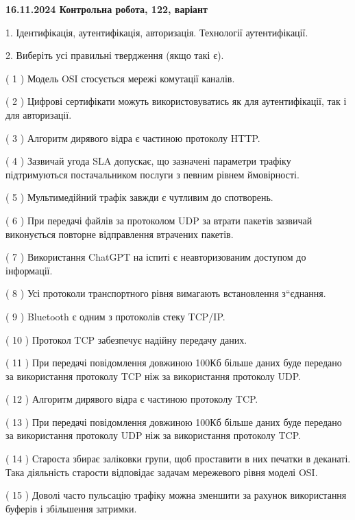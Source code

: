 \documentclass[12pt, ukrainian]{article}
\begin{document}
\vspace{4mm}
\newpage
\begin {large}

\textbf{16.11.2024 Контрольна робота, 122, варіант  }\par


{
1. Ідентифікація, аутентифікація, авторизація. Технології аутентифікації.



\vspace{5mm}
2. Виберіть усі правильні твердження (якщо такі є).\par
\vspace{2mm}

( 1 ) Модель OSI стосується мережі комутації каналів.

( 2 ) Цифрові сертифікати можуть використовуватись як для аутентифікації, так і для авторизації.

( 3 ) Алгоритм дирявого відра є частиною протоколу HTTP.

( 4 ) Зазвичай угода  SLA допускає, що зазначені параметри трафіку підтримуються постачальником послуги з певним рівнем ймовірності.

( 5 ) Мультимедійний трафік завжди є чутливим до спотворень.

( 6 ) При передачі файлів за протоколом UDP за втрати пакетів зазвичай виконується повторне відправлення втрачених пакетів.

( 7 ) Використання ChatGPT на іспиті є неавторизованим доступом до інформації.

( 8 ) Усі протоколи транспортного рівня вимагають встановлення з“єднання.

( 9 ) Bluetooth є одним з протоколів стеку TCP/IP.

( 10 ) Протокол TCP забезпечує надійну передачу даних.

( 11 ) При передачі повідомлення довжиною 100Кб більше даних буде передано за використання протоколу TCP ніж за використання протоколу UDP.

( 12 ) Алгоритм дирявого відра є частиною протоколу TCP.

( 13 ) При передачі повідомлення довжиною 100Кб більше даних буде передано за використання протоколу UDP ніж за використання протоколу TCP.

( 14 ) Староста збирає заліковки групи, щоб проставити в них печатки в деканаті. Така діяльність старости відповідає задачам мережевого рівня моделі OSI.

( 15 ) Доволі часто пульсацію трафіку можна зменшити за рахунок використання буферів і збільшення затримки.
}
\end {large}
\end{document}

